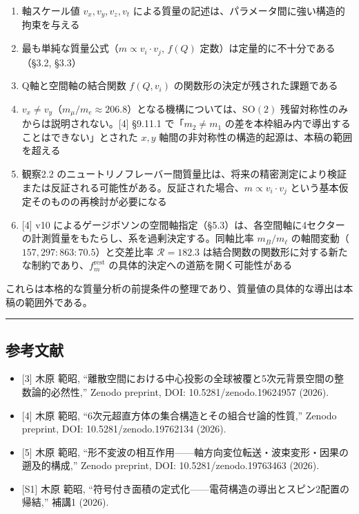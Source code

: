 \documentclass[
  a4paper,11pt]{ltjsarticle}
\providecommand{\tightlist}{%
  \setlength{\itemsep}{0pt}\setlength{\parskip}{0pt}}
\begin{document}
\begin{enumerate}
\def\labelenumi{\arabic{enumi}.}
\tightlist
\item
  軸スケール値 \(v_x, v_y, v_z, v_t\)
  による質量の記述は、パラメータ間に強い構造的拘束を与える
\item
  最も単純な質量公式（\(m \propto v_i \cdot v_j\), \(f(Q)\)
  定数）は定量的に不十分である（§3.2, §3.3）
\item
  Q軸と空間軸の結合関数 \(f(Q, v_i)\) の関数形の決定が残された課題である
\item
  \(v_x \neq v_y\)（\(m_\mu / m_e \approx 206.8\)）となる機構については、\(\mathrm{SO}(2)\)
  残留対称性のみからは説明されない。{[}4{]} §9.11.1 で「\(m_2 \neq m_1\)
  の差を本枠組み内で導出することはできない」とされた \(x, y\)
  軸間の非対称性の構造的起源は、本稿の範囲を超える
\item
  観察2.2
  のニュートリノフレーバー間質量比は、将来の精密測定により検証または反証される可能性がある。反証された場合、\(m \propto v_i \cdot v_j\)
  という基本仮定そのものの再検討が必要になる
\item
  {[}4{]} v10
  によるゲージボソンの空間軸指定（§5.3）は、各空間軸に4セクターの計測質量をもたらし、系を過剰決定する。同軸比率
  \(m_B / m_\ell\) の軸間変動（\(157{,}297 : 863 : 70.5\)）と交差比率
  \(\mathcal{R} = 182.3\)
  は結合関数の関数形に対する新たな制約であり、\(f_m^{\text{rest}}\)
  の具体的決定への道筋を開く可能性がある
\end{enumerate}

これらは本格的な質量分析の前提条件の整理であり、質量値の具体的な導出は本稿の範囲外である。

\begin{center}\rule{0.5\linewidth}{0.5pt}\end{center}

\subsection{参考文献}\label{ux53c2ux8003ux6587ux732e}

\begin{itemize}
\tightlist
\item
  {[}3{]} 木原 範昭,
  ``離散空間における中心投影の全球被覆と5次元背景空間の整数論的必然性,''
  Zenodo preprint, DOI: 10.5281/zenodo.19624957 (2026).
\item
  {[}4{]} 木原 範昭, ``6次元超直方体の集合構造とその組合せ論的性質,''
  Zenodo preprint, DOI: 10.5281/zenodo.19762134 (2026).
\item
  {[}5{]} 木原 範昭,
  ``形不変波の相互作用------軸方向変位転送・波束変形・因果の遡及的構成,''
  Zenodo preprint, DOI: 10.5281/zenodo.19763463 (2026).
\item
  {[}S1{]} 木原 範昭,
  ``符号付き面積の定式化------電荷構造の導出とスピン2配置の帰結,'' 補講1
  (2026).
\end{itemize}
\end{document}
